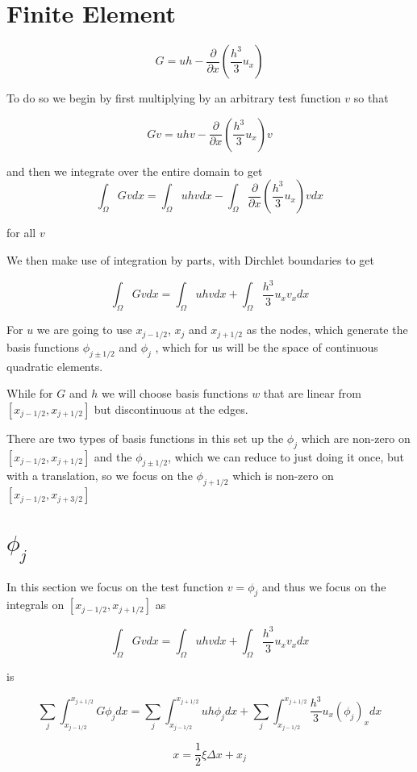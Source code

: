 \documentclass[12pt]{article}
\begin{document}
\section{Finite Element}

\[G = uh - \frac{\partial}{\partial x}\left(\frac{h^3}{3}u_x\right)\]

To do so we begin by first multiplying by an arbitrary test function $v$ so that

\[Gv = uhv  - \frac{\partial}{\partial x}\left(\frac{h^3}{3}u_x\right)v\]

and then we integrate over the entire domain to get 
\[\int_\Omega Gv dx = \int_\Omega uhv dx - \int_\Omega \frac{\partial}{\partial x}\left(\frac{h^3}{3}u_x\right)vdx\]

for all $v$

We then make use of integration by parts, with Dirchlet boundaries to get

\[\int_\Omega Gv dx = \int_\Omega uhv dx + \int_\Omega\frac{h^3}{3}u_{x}v_xdx\]

For $u$ we are going to use $x_{j - 1/2}$, $x_{j}$ and $x_{j + 1/2}$ as the nodes, which generate the basis functions $\phi_{j \pm 1/2}$ and $\phi_{j}$ , which for us will be the space of continuous quadratic elements. 

While for $G$  and $h$ we will choose basis functions $w$ that are linear from $[x_{j-1/2}, x_{j+1/2}]$ but discontinuous at the edges.

There are two types of basis functions in this set up the $\phi_{j}$ which are non-zero on
$[x_{j-1/2}, x_{j+1/2}]$ and the $\phi_{j \pm 1/2}$, which we can reduce to just doing it once, but with a translation, so we focus on the $\phi_{j + 1/2}$  which is non-zero on  $[x_{j-1/2}, x_{j+3/2}]$
\section{$\phi_{j}$}
In this section we focus on the test function $v =\phi_{j}$ and thus we focus on the integrals on $[x_{j-1/2}, x_{j+1/2}]$ as 

\[\int_\Omega Gv dx = \int_\Omega uhv dx + \int_\Omega\frac{h^3}{3}u_{x}v_xdx\]

is 

\[\sum_{j}\int_{x_{j-1/2}}^{x_{j+1/2}} G\phi_{j} dx = \sum_{j}\int_{x_{j-1/2}}^{x_{j+1/2}}  uh \phi_{j} dx + \sum_{j}\int_{x_{j-1/2}}^{x_{j+1/2}} \frac{h^3}{3}u_{x}{(\phi_{j})}_{x}dx\]

$$x = \frac{1}{2}\xi\Delta x + x_{j}$$
\end{document}
